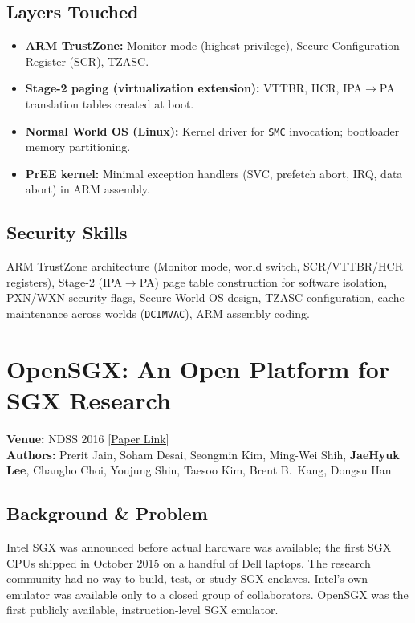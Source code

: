 \documentclass[11pt,letterpaper]{article}
\begin{document}
\subsection*{Layers Touched}
\begin{itemize}
    \item \textbf{ARM TrustZone:} Monitor mode (highest privilege), Secure Configuration Register (SCR), TZASC.
    \item \textbf{Stage-2 paging (virtualization extension):} VTTBR, HCR, IPA$\to$PA translation tables created at boot.
    \item \textbf{Normal World OS (Linux):} Kernel driver for \texttt{SMC} invocation; bootloader memory partitioning.
    \item \textbf{PrEE kernel:} Minimal exception handlers (SVC, prefetch abort, IRQ, data abort) in ARM assembly.
\end{itemize}

\subsection*{Security Skills}
ARM TrustZone architecture (Monitor mode, world switch, SCR/VTTBR/HCR registers), Stage-2 (IPA$\to$PA) page table construction for software isolation, PXN/WXN security flags, Secure World OS design, TZASC configuration, cache maintenance across worlds (\texttt{DCIMVAC}), ARM assembly coding.

\newpage

\section{OpenSGX: An Open Platform for SGX Research}
\textbf{Venue:} NDSS 2016 \hfill
\href{https://taesoo.kim/pubs/2016/jain:opensgx.pdf}{[Paper Link]}\\
\textbf{Authors:} Prerit Jain, Soham Desai, Seongmin Kim, Ming-Wei Shih, \textbf{JaeHyuk Lee}, Changho Choi, Youjung Shin, Taesoo Kim, Brent B.\ Kang, Dongsu Han

\subsection*{Background \& Problem}
Intel SGX was announced before actual hardware was available; the first SGX CPUs shipped in October 2015 on a handful of Dell laptops.
The research community had no way to build, test, or study SGX enclaves.
Intel's own emulator was available only to a closed group of collaborators.
OpenSGX was the first publicly available, instruction-level SGX emulator.
\end{document}

